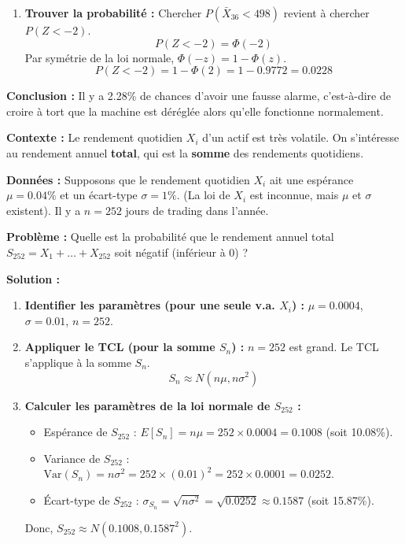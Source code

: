 \begin{examplebox}
\begin{enumerate}
    \item \textbf{Trouver la probabilité :}
    Chercher $P(\bar{X}_{36} < 498)$ revient à chercher $P(Z < -2)$.
    $$ P(Z < -2) = \Phi(-2) $$
    Par symétrie de la loi normale, $\Phi(-z) = 1 - \Phi(z)$.
    $$ P(Z < -2) = 1 - \Phi(2) = 1 - 0.9772 = 0.0228 $$
\end{enumerate}
\textbf{Conclusion :} Il y a 2.28\% de chances d'avoir une fausse alarme, c'est-à-dire de croire à tort que la machine est déréglée alors qu'elle fonctionne normalement.
\end{examplebox}

\begin{examplebox}
\textbf{Contexte :} Le rendement quotidien $X_i$ d'un actif est très volatile. On s'intéresse au rendement annuel \textbf{total}, qui est la \textbf{somme} des rendements quotidiens.

\textbf{Données :} Supposons que le rendement quotidien $X_i$ ait une espérance $\mu = 0.04\%$ et un écart-type $\sigma = 1\%$. (La loi de $X_i$ est inconnue, mais $\mu$ et $\sigma$ existent). Il y a $n=252$ jours de trading dans l'année.

\textbf{Problème :} Quelle est la probabilité que le rendement annuel total $S_{252} = X_1 + \dots + X_{252}$ soit négatif (inférieur à 0) ?

\textbf{Solution :}
\begin{enumerate}
    \item \textbf{Identifier les paramètres (pour une seule v.a. $X_i$) :}
    $\mu = 0.0004$, $\sigma = 0.01$, $n = 252$.
    
    \item \textbf{Appliquer le TCL (pour la somme $S_n$) :}
    $n=252$ est grand. Le TCL s'applique à la somme $S_n$.
    $$ S_n \approx N\left(n\mu, n\sigma^2\right) $$
    
    \item \textbf{Calculer les paramètres de la loi normale de $S_{252}$ :}
    \begin{itemize}
        \item Espérance de $S_{252}$ : $E[S_n] = n\mu = 252 \times 0.0004 = 0.1008$ (soit 10.08\%).
        \item Variance de $S_{252}$ : $\text{Var}(S_n) = n\sigma^2 = 252 \times (0.01)^2 = 252 \times 0.0001 = 0.0252$.
        \item Écart-type de $S_{252}$ : $\sigma_{S_n} = \sqrt{n\sigma^2} = \sqrt{0.0252} \approx 0.1587$ (soit 15.87\%).
    \end{itemize}
    Donc, $S_{252} \approx N(0.1008, 0.1587^2)$.
    

\end{enumerate}
\end{examplebox}
